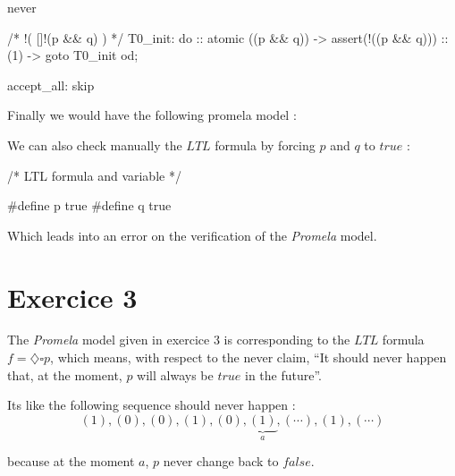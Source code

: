\documentclass[a4paper,11pt]{report}
\newcommand{\ex}[3]{\cfile[firstline=#1,lastline=#2]{ex#3.pml}}
\begin{document}
\begin{promelacode}
  never  {    /* !( []!(p && q) ) */
    T0_init:
    do
    :: atomic { ((p && q)) -> assert(!((p && q))) }
    :: (1) -> goto T0_init
    od;

    accept_all:
    skip
  }
\end{promelacode}

Finally we would have the following promela model :

\ex{8}{52}{2}

We can also check manually the $LTL$ formula by forcing $p$ and $q$ to $true$ :

\begin{promelacode}
/* LTL formula and variable */

#define p true
#define q true
\end{promelacode}

Which leads into an error on the verification of the \textit{Promela} model.

\section*{Exercice 3}

The \textit{Promela} model given in exercice $3$ is corresponding to the $LTL$
formula $f = \diamondsuit \square p$, which means, with respect to the never
claim, ``It should never happen that, at the moment, $p$ will always be $true$
in the future''.

Its like the following sequence should never happen :
\[
  (1) , (0) , (0) , (1) , (0) , \underbrace{(1)}_{a} , (\cdots) , (1) , (\cdots)
\]

because at the moment $a$, $p$ never change back to $false$.
\end{document}
